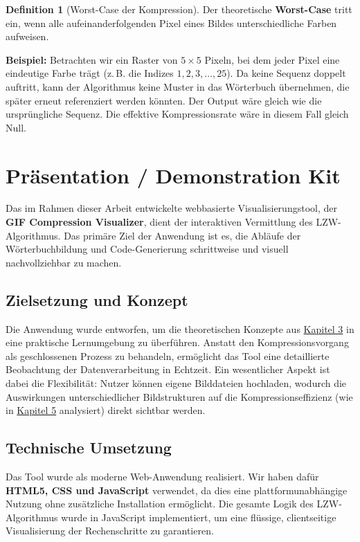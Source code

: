 \documentclass[a4paper,11pt]{scrartcl}
\theoremstyle{definition} %
\newtheorem{defi}{Definition}[section]
\begin{document}
\begin{defi}[Worst-Case der Kompression]
Der theoretische \textbf{Worst-Case} tritt ein, wenn alle aufeinanderfolgenden Pixel eines Bildes unterschiedliche Farben aufweisen.
\end{defi}

\noindent \textbf{Beispiel:} Betrachten wir ein Raster von $5 \times 5$ Pixeln, bei dem jeder Pixel eine eindeutige Farbe trägt (z.\,B. die Indizes $1, 2, 3, \dots, 25$). Da keine Sequenz doppelt auftritt, kann der Algorithmus keine Muster in das Wörterbuch übernehmen, die später erneut referenziert werden könnten. Der Output wäre gleich wie die ursprüngliche Sequenz. Die effektive Kompressionsrate wäre in diesem Fall gleich Null.

\section{Präsentation / Demonstration Kit}

Das im Rahmen dieser Arbeit entwickelte webbasierte Visualisierungstool, der \textbf{GIF Compression Visualizer}, dient der interaktiven Vermittlung des LZW-Algorithmus. Das primäre Ziel der Anwendung ist es, die Abläufe der Wörterbuchbildung und Code-Generierung schrittweise und visuell nachvollziehbar zu machen.

\subsection{Zielsetzung und Konzept}
Die Anwendung wurde entworfen, um die theoretischen Konzepte aus \hyperref[kap:algo]{Kapitel 3} in eine praktische Lernumgebung zu überführen. Anstatt den Kompressionsvorgang als geschlossenen Prozess zu behandeln, ermöglicht das Tool eine detaillierte Beobachtung der Datenverarbeitung in Echtzeit. Ein wesentlicher Aspekt ist dabei die Flexibilität: Nutzer können eigene Bilddateien hochladen, wodurch die Auswirkungen unterschiedlicher Bildstrukturen auf die Kompressionseffizienz (wie in \hyperref[kap:bew]{Kapitel 5} analysiert) direkt sichtbar werden.

\subsection{Technische Umsetzung}
Das Tool wurde als moderne Web-Anwendung realisiert. Wir haben dafür \textbf{HTML5, CSS und JavaScript} verwendet, da dies eine plattformunabhängige Nutzung ohne zusätzliche Installation ermöglicht. Die gesamte Logik des LZW-Algorithmus wurde in JavaScript implementiert, um eine flüssige, clientseitige Visualisierung der Rechenschritte zu garantieren.
\end{document}
